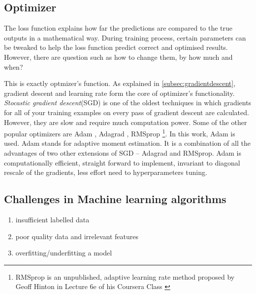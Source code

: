 \subsection{Optimizer}
\label{subsec:optimizer}
The loss function explains how far the predictions are compared to the true
outputs in a mathematical way. During training process, certain parameters can be tweaked
to help the loss function predict correct and optimised results. However, there are
question such as how to change them, by how much and when?

This is exactly optmizer's function. As explained in \ref{subsec:gradientdescent}, gradient
descent and learning rate form the core of optimizer's functionality. \textit{Stocastic
gradient descent}(SGD) is one of the oldest techniques in which gradients for all of your
training examples on every pass of gradient descent are calculated. However, they are slow
and require much computation power. Some of the other popular optimizers are Adam
\cite{kingma2014adam}, Adagrad \cite{adagradpaper}, RMSprop \footnote{RMSprop is an unpublished, adaptive learning rate
method proposed by Geoff Hinton in Lecture 6e of his Coursera Class \cite{RMSProp}}. In this work, Adam is used. Adam stands for adaptive moment estimation.
It is a combination of all the advantages of two other extensions of SGD -- Adagrad and
RMSprop. Adam is computationally efficient, straight forward to implement, invariant to
diagonal rescale of the gradients, less effort need to hyperparameters tuning.

\subsection{Challenges in Machine learning algorithms}
\begin{enumerate}
    \item insufficient labelled data
    \item poor quality data and irrelevant features
    \item overfitting/underfitting a model
\end{enumerate}

